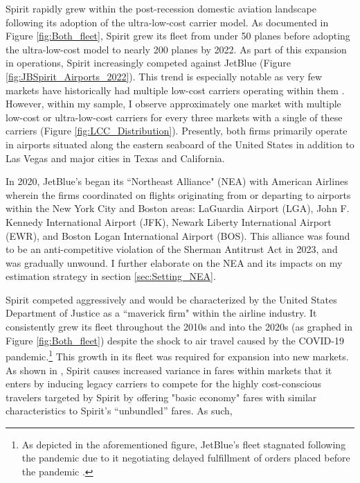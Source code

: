 \documentclass{article}
\begin{document}
    Spirit rapidly grew within the post-recession domestic aviation landscape following its adoption of the ultra-low-cost carrier model. As documented in Figure \ref{fig:Both_fleet}, Spirit grew its fleet from under 50 planes before adopting the ultra-low-cost model to nearly 200 planes by 2022. As part of this expansion in operations, Spirit increasingly competed against JetBlue (Figure \ref{fig:JBSpirit_Airports_2022}). This trend is especially notable as very few markets have historically had multiple low-cost carriers operating within them \citep{kwoka_fringe_2016, ciliberto_market_2021}. However, within my sample, I observe approximately one market with multiple low-cost or ultra-low-cost carriers for every three markets with a single of these carriers (Figure \ref{fig:LCC_Distribution}). Presently, both firms primarily operate in airports situated along the eastern seaboard of the United States in addition to Las Vegas and major cities in Texas and California.
    
	In 2020,  JetBlue's began its ``Northeast Alliance" (NEA) with American Airlines wherein the firms coordinated on flights originating from or departing to airports within the New York City and Boston areas: LaGuardia Airport (LGA), John F. Kennedy International Airport (JFK), Newark Liberty International Airport (EWR), and Boston Logan International Airport (BOS). This alliance was found to be an anti-competitive violation of the Sherman Antitrust Act in 2023, and was gradually unwound.  I further elaborate on the NEA and its impacts on my estimation strategy in section \ref{sec:Setting_NEA}.
	
	Spirit competed aggressively and would be characterized by the United States Department of Justice as a ``maverick firm" within the airline industry. It consistently grew its fleet throughout the 2010s and into the 2020s (as graphed in Figure \ref{fig:Both_fleet}) despite the shock to air travel caused by the COVID-19 pandemic.\footnote{As depicted in the aforementioned figure, JetBlue's fleet stagnated following the pandemic due to it negotiating delayed fulfillment of orders placed before the pandemic \citep{bellamy_iii_jetblue_2020, sipinski_jetblue_2020}.} This growth in its fleet was required for expansion into new markets. As shown in \citet{shrago_spirit_2024}, Spirit causes increased variance in fares within markets that it enters by inducing legacy carriers to compete for the highly cost-conscious travelers targeted by Spirit by offering "basic economy" fares with similar characteristics to Spirit's ``unbundled'' fares. As such, 
	
\end{document}
